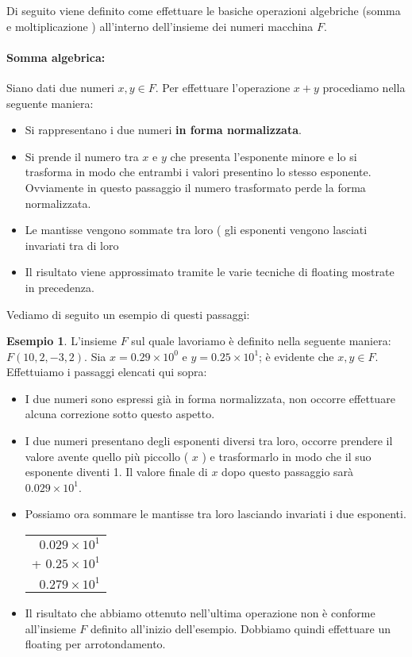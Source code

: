 \documentclass[12pt, a4paper]{book}
\theoremstyle{definition}
\newtheorem{exmp}{Esempio}[section]
\begin{document}
\begin{flushleft}


Di seguito viene definito come effettuare le basiche operazioni algebriche (somma e moltiplicazione ) all'interno dell'insieme dei numeri macchina $F$.

\paragraph{Somma algebrica: } Siano dati due numeri $x, y \in F$.  Per effettuare l'operazione $x + y$ procediamo nella seguente maniera: \\
\begin{itemize}
	\item  Si rappresentano i due numeri \textbf{in forma normalizzata}. 
	\item  Si prende il numero tra $x$ e $y$ che presenta l'esponente minore e lo si trasforma in modo che entrambi i valori presentino lo stesso esponente.  Ovviamente in questo passaggio il numero trasformato perde la forma normalizzata. 
	\item  Le mantisse vengono sommate tra loro ( gli esponenti vengono lasciati invariati tra di loro 
	\item  Il risultato viene approssimato tramite le varie tecniche di floating mostrate in precedenza. 
\end{itemize}

Vediamo di seguito un esempio di questi passaggi: 

\begin{exmp}
L'insieme $F$ sul quale lavoriamo è definito nella seguente maniera: $F(10, 2, -3,2)$.  Sia $x = 0.29 \times 10^{0}$  e $ y = 0.25 \times 10^{1}$; è evidente che $x,y \in F$.  
Effettuiamo i passaggi elencati qui sopra: 
\begin{itemize}
	\item I due numeri sono espressi già in forma normalizzata, non occorre effettuare alcuna correzione sotto questo aspetto.
	\item I due numeri presentano degli esponenti diversi tra loro, occorre prendere il valore avente quello più piccollo ( $x$ ) e trasformarlo in modo che il suo esponente diventi 1. Il valore finale di $x$ dopo questo passaggio sarà $0.029 \times 10^{1}$.  
	\item Possiamo ora sommare le mantisse tra loro lasciando invariati i due esponenti. \\
	\vspace{1em}
	 \begin{tabular}{r}
    $0.029 \times 10^{1}$ \\ 
    + $0.25 \times 10^{1}$  \\ 
     \hline
     $0.279 \times 10^{1}$
 \end{tabular}
 	\item Il risultato che abbiamo ottenuto nell'ultima operazione non è conforme all'insieme $F$ definito all'inizio dell'esempio. Dobbiamo quindi effettuare un floating per arrotondamento.
 	

\end{itemize}
\end{exmp}
\end{flushleft}
\end{document}
